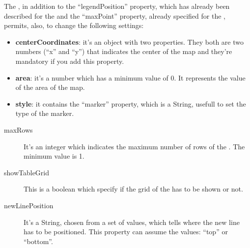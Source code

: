 			The , in addition to the “legendPosition” property, which has already been described for the  and the “maxPoint” property, already specified for the , permits, also, to change the following settings:
			\begin{itemize}
				\item \textbf{centerCoordinates}: it's an object with two properties. They both are two numbers (“x” and “y”) that indicates the center of the map and they're mandatory if you add this property.
				\item \textbf{area}: it's a number which has a minimum value of 0. It represents the value of the area of the map.
				\item \textbf{style}: it contains the “marker” property, which is a String, usefull to set the type of the marker.
			\end{itemize}
		\begin{description}
			\item[maxRows] It's an integer which indicates the maximum number of rows of the . The minimum value is 1.
			\item[showTableGrid] This is a boolean which specify if the grid of the  has to be shown or not.
			\item[newLinePosition] It's a String, chosen from a set of values, which tells where the new line has to be positioned. This property can assume the values: “top” or “bottom”.
		\end{description}

